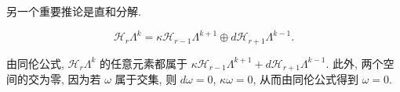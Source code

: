 另一个重要推论是直和分解.

\begin{Corollary}\label{cor:homogeneous-koszul-decomposition}
\begin{equation}\label{eq:homogeneous-koszul-decomposition}
\mathcal H_r\Lambda^k=\kappa\mathcal H_{r-1}\Lambda^{k+1}\oplus d\mathcal H_{r+1}\Lambda^{k-1}.
\end{equation}
\end{Corollary}

\begin{Proof}
由同伦公式, $\mathcal H_r\Lambda^k$ 的任意元素都属于 $\kappa\mathcal H_{r-1}\Lambda^{k+1}+d\mathcal H_{r+1}\Lambda^{k-1}$. 此外, 两个空间的交为零, 因为若 $\omega$ 属于交集, 则 $d\omega=0$, $\kappa\omega=0$, 从而由同伦公式得到 $\omega=0$.
\end{Proof}
